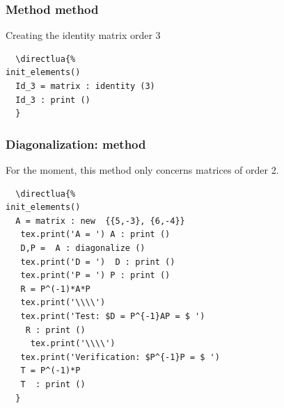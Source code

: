 
\subsubsection{Method method  }%
\label{ssub:methode_identity}

Creating the identity matrix order 3


\begin{minipage}{.5\textwidth}
\begin{Verbatim}
  \directlua{%
init_elements()
  Id_3 = matrix : identity (3)
  Id_3 : print ()
  }
\end{Verbatim}
\end{minipage}
\begin{minipage}{.5\textwidth}
\end{minipage}


\newpage

\subsubsection{Diagonalization: method } %
\label{ssub:diagonalization}

For the moment, this method only concerns matrices of order 2.

\begin{minipage}{.5\textwidth}
\begin{Verbatim}
  \directlua{%
init_elements()
  A = matrix : new  {{5,-3}, {6,-4}}
   tex.print('A = ') A : print ()
   D,P =  A : diagonalize ()
   tex.print('D = ')  D : print ()
   tex.print('P = ') P : print ()
   R = P^(-1)*A*P
   tex.print('\\\\')
   tex.print('Test: $D = P^{-1}AP = $ ')
    R : print ()
     tex.print('\\\\')
   tex.print('Verification: $P^{-1}P = $ ')
   T = P^(-1)*P
   T  : print ()
  }
\end{Verbatim}
\end{minipage}
\begin{minipage}{.5\textwidth}
\end{minipage}

